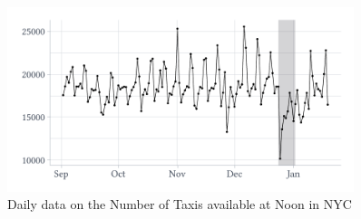 \documentclass[12pt]{article}
\begin{document}
\begin{figure}[h!]
  \caption{Daily data on the Number of Taxis available at Noon in NYC}
  \label{fig:taxi}

  \vspace*{-\bigskipamount}
  \begin{center}
    \includegraphics[width = 0.9\textwidth]{figures/nyc_taxis_raw.pdf}
  \end{center}
\end{figure}
\end{document}
